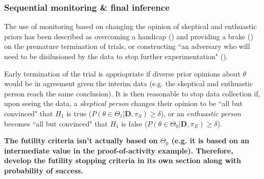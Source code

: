 \documentclass[12pt]{article}
\begin{document}
\subsubsection{Sequential monitoring \& final inference}
The use of monitoring based on changing the opinion of skeptical and enthuastic priors has been described as overcoming a handicap (\cite{Freedman1989}) and providing a brake (\cite{Fayers1997}) on the premature termination of trials, or constructing ``an adversary who will need to be disilusioned by the data to stop further experimentation" (\cite{Spiegelhalter1994}). 

Early termination of the trial is appriopriate if diverse prior opinions about $\theta$ would be in agreement given the interim data (e.g. the skeptical and enthuastic person reach the same conclusion). It is then reasonable to stop data collection if, upon seeing the data, a \textit{skeptical person} changes their opinion to be ``all but convinced" that $H_1$ is true ($P(\theta\in\Theta_1|\mathbf{D}, \pi_{S})\geq\delta$), or an \textit{enthuastic person} becomes ``all but convinced" that $H_1$ is false ($P(\theta\in\Theta_0|\mathbf{D}, \pi_{E})\geq\delta$).

\textbf{The futility criteria isn't actually based on $\Theta_0$ (e.g. it is based on an intermediate value in the proof-of-activity example). Therefore, develop the futility stopping criteria in its own section along with probability of success.}

\end{document}
